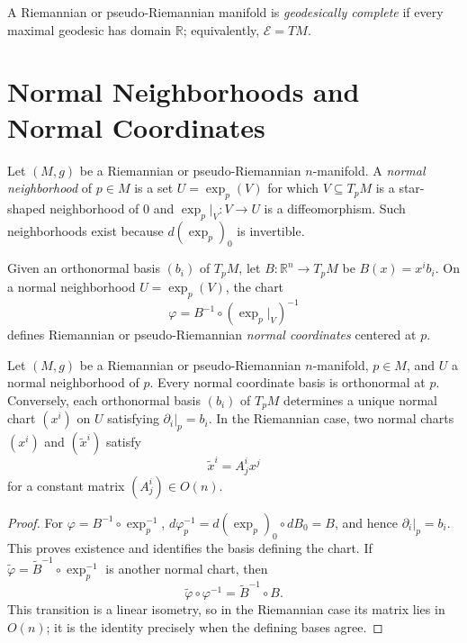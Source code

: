 A Riemannian or pseudo-Riemannian manifold is \emph{geodesically complete} if
every maximal geodesic has domain $\mathbb R$; equivalently,
$\mathcal E=TM$.

\section{Normal Neighborhoods and Normal Coordinates}

Let $(M,g)$ be a Riemannian or pseudo-Riemannian $n$-manifold.  A
\emph{normal neighborhood} of $p\in M$ is a set $U=\exp_p(V)$ for which
$V\subseteq T_pM$ is a star-shaped neighborhood of $0$ and
$\exp_p|_V:V\to U$ is a diffeomorphism.  Such neighborhoods exist because
$d(\exp_p)_0$ is invertible.

Given an orthonormal basis $(b_i)$ of $T_pM$, let
$B:\mathbb R^n\to T_pM$ be $B(x)=x^ib_i$.  On a normal neighborhood
$U=\exp_p(V)$, the chart
\[
\varphi=B^{-1}\circ(\exp_p|_V)^{-1}
\]
defines Riemannian or pseudo-Riemannian \emph{normal coordinates} centered at
$p$.

\begin{proposition}
\label{prop:uniqueness-normal-coordinates}

Let $(M,g)$ be a Riemannian or pseudo-Riemannian $n$-manifold, $p\in M$, and
$U$ a normal neighborhood of $p$.  Every normal coordinate basis is
orthonormal at $p$.  Conversely, each orthonormal basis $(b_i)$ of $T_pM$
determines a unique normal chart $(x^i)$ on $U$ satisfying
$\partial_i|_p=b_i$.  In the Riemannian case, two normal charts $(x^i)$ and
$(\tilde x^i)$ satisfy
\begin{equation}
\tilde{x}^i = A^i_j x^j \tag{5.19}
\end{equation}
for a constant matrix $(A^i_j)\in O(n)$.

\begin{proof}
\sketch
For $\varphi=B^{-1}\circ\exp_p^{-1}$,
$d\varphi_p^{-1}=d(\exp_p)_0\circ dB_0=B$, and hence
$\partial_i|_p=b_i$.  This proves existence and identifies the basis defining
the chart.  If $\widetilde\varphi=\widetilde B^{-1}\circ\exp_p^{-1}$ is
another normal chart, then
\[
\widetilde\varphi\circ\varphi^{-1}=\widetilde B^{-1}\circ B.
\]
This transition is a linear isometry, so in the Riemannian case its matrix
lies in $O(n)$; it is the identity precisely when the defining bases agree.
\end{proof}
\end{proposition}

